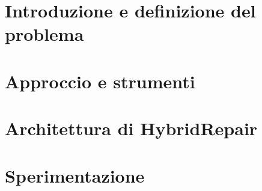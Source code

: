 \documentclass[12pt,a4paper,oneside]{book} %
\begin{document}
\frontmatter

\tableofcontents 

\mainmatter
\chapter{Introduzione e definizione del problema}


\chapter{Approccio e strumenti}



\chapter{Architettura di HybridRepair}
\label{cap:architettura}








\chapter{Sperimentazione}
\label{cap:sperimentazione}

\backmatter
\printbibliography[title={Bibliografia}]


\end{document}
